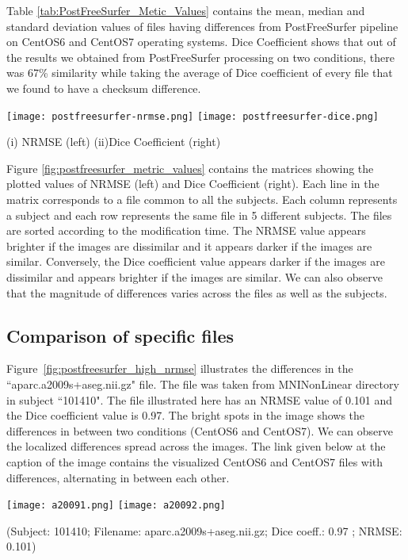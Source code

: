 Table \ref{tab:PostFreeSurfer_Metic_Values} contains the mean, median and standard deviation values of files having differences from PostFreeSurfer pipeline on CentOS6 and CentOS7 operating systems. Dice Coefficient shows that out of the results we obtained from PostFreeSurfer processing on two conditions, there was 67\% similarity while taking the average of Dice coefficient of every file that we found to have a checksum difference.

\begin{center}
\texttt{[image: postfreesurfer-nrmse.png]}%
\texttt{[image: postfreesurfer-dice.png]}
\caption*{(i) NRMSE (left) (ii)Dice Coefficient (right)}
\label{fig:postfreesurfer_metric_values}
\end{center}

Figure \ref{fig:postfreesurfer_metric_values} contains the matrices showing the plotted values of NRMSE (left) and Dice Coefficient (right). Each line in the matrix corresponds to a file common to all the subjects. Each column represents a subject and each row represents the same file in 5 different subjects. The files are sorted according to the modification time. The NRMSE value appears brighter if the images are dissimilar and it appears darker if the images are similar. Conversely, the Dice coefficient value appears darker if the images are dissimilar and appears brighter if the images are similar. We can also observe that the magnitude of differences varies across the files as well as the subjects.

\subsection{Comparison of specific files}
Figure~\ref{fig:postfreesurfer_high_nrmse} illustrates the differences in the ``aparc.a2009s+aseg.nii.gz" file. The file was taken from MNINonLinear directory in subject ``101410". The file illustrated here has an NRMSE value of 0.101 and the Dice coefficient value is 0.97. The bright spots in the image shows the differences in between two conditions (CentOS6 and CentOS7). We can observe the localized differences spread across the images. The link given below at the caption of the image contains the visualized CentOS6 and CentOS7 files with differences, alternating in between each other.

\begin{center}
\texttt{[image: a20091.png]}%
\texttt{[image: a20092.png]}
\caption*{(Subject: 101410; Filename: aparc.a2009s+aseg.nii.gz; Dice coeff.: 0.97 ; NRMSE: 0.101)}
\label{fig:postfreesurfer_high_nrmse}
\end{center}

